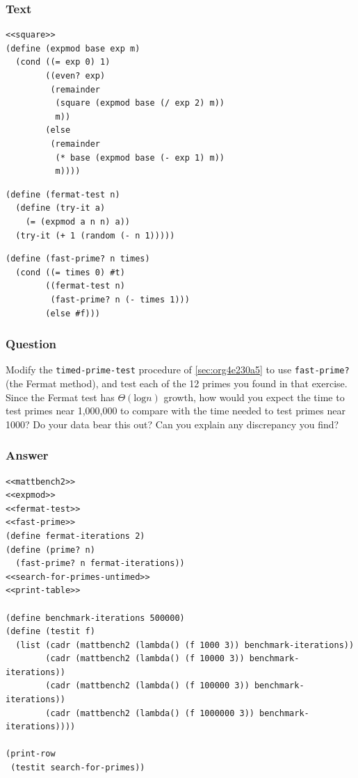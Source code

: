 \documentclass[final,fleqn,titlepage,twoside]{article}
\begin{document}
\subsubsection{Text}
\label{sec:org7b913f7}
\begin{verbatim}
<<square>>
(define (expmod base exp m)
  (cond ((= exp 0) 1)
        ((even? exp)
         (remainder 
          (square (expmod base (/ exp 2) m))
          m))
        (else
         (remainder 
          (* base (expmod base (- exp 1) m))
          m))))
\end{verbatim}
\begin{verbatim}
(define (fermat-test n)
  (define (try-it a)
    (= (expmod a n n) a))
  (try-it (+ 1 (random (- n 1)))))
\end{verbatim}
\begin{verbatim}
(define (fast-prime? n times)
  (cond ((= times 0) #t)
        ((fermat-test n) 
         (fast-prime? n (- times 1)))
        (else #f)))
\end{verbatim}

\subsubsection{Question}
\label{sec:org190be57}
Modify the \texttt{timed-prime-test} procedure of \ref{sec:org4e230a5} to use
\texttt{fast-prime?} (the Fermat method), and test each of the 12 primes you
found in that exercise. Since the Fermat test has \(\Theta(\text{log}n)\)
growth, how would you expect the time to test primes near 1,000,000 to compare
with the time needed to test primes near 1000? Do your data bear this out? Can
you explain any discrepancy you find?

\subsubsection{Answer}
\label{sec:org8f1d288}
\begin{verbatim}
<<mattbench2>>
<<expmod>>
<<fermat-test>>
<<fast-prime>>
(define fermat-iterations 2)
(define (prime? n)
  (fast-prime? n fermat-iterations))
<<search-for-primes-untimed>>
<<print-table>>

(define benchmark-iterations 500000)
(define (testit f)
  (list (cadr (mattbench2 (lambda() (f 1000 3)) benchmark-iterations))
        (cadr (mattbench2 (lambda() (f 10000 3)) benchmark-iterations))
        (cadr (mattbench2 (lambda() (f 100000 3)) benchmark-iterations))
        (cadr (mattbench2 (lambda() (f 1000000 3)) benchmark-iterations))))

(print-row
 (testit search-for-primes))
\end{verbatim}
\end{document}
